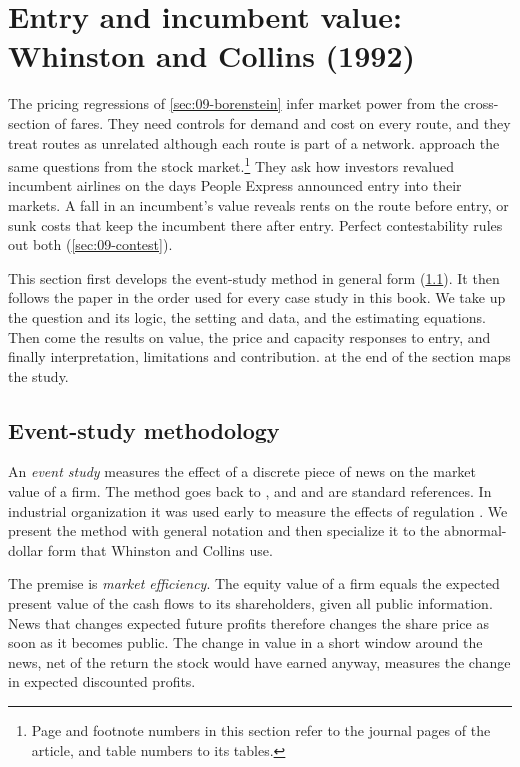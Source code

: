 \section{Entry and incumbent value: Whinston and Collins (1992)}\label{sec:09-wc}

The pricing regressions of \cref{sec:09-borenstein} infer market power from the cross-section of
fares. They need controls for demand and cost on every route, and they treat routes as unrelated
although each route is part of a network. \citet{WhinstonCollins1992} approach the same questions
from the stock market.\footnote{Page and footnote numbers in this section refer to the journal pages of
the article, and table numbers to its tables.} They ask how investors revalued incumbent airlines on the days People Express
announced entry into their markets. A fall in an incumbent's value reveals rents on the route before
entry, or sunk costs that keep the incumbent there after entry. Perfect contestability rules out both
(\cref{sec:09-contest}).

This section first develops the event-study method in general form (\cref{sec:09-wc-method}). It then
follows the paper in the order used for every case study in this book. We take up the question and its
logic, the setting and data, and the estimating equations. Then come the results on value, the price
and capacity responses to entry, and finally interpretation, limitations and contribution.
 at the end of the section maps the study.

\subsection{Event-study methodology}\label{sec:09-wc-method}

An \emph{event study} measures the effect of a discrete piece of news on the market value of a firm.
The method goes back to \citet{FamaEtAl1969}, and \citet{BrownWarner1985} and \citet{MacKinlay1997} are
standard references. In industrial organization it was
used early to measure the effects of regulation \citep{Schwert1981,Rose1985}. We present the method
with general notation and then specialize it to the abnormal-dollar form that Whinston and Collins
use.

The premise is \emph{market efficiency}. The equity value of a firm equals the expected present value
of the cash flows to its shareholders, given all public information. News that changes expected
future profits therefore changes the share price as soon as it becomes public. The change in value in
a short window around the news, net of the return the stock would have earned anyway, measures the
change in expected discounted profits.

